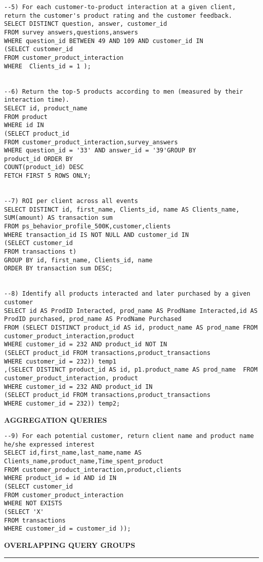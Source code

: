\begin{lstlisting}
--5) For each customer-to-product interaction at a given client, return the customer's product rating and the customer feedback.
SELECT DISTINCT question, answer, customer_id
FROM survey answers,questions,answers
WHERE question_id BETWEEN 49 AND 109 AND customer_id IN
(SELECT customer_id
FROM customer_product_interaction
WHERE  Clients_id = 1 );


--6) Return the top-5 products according to men (measured by their interaction time).
SELECT id, product_name
FROM product
WHERE id IN
(SELECT product_id
FROM customer_product_interaction,survey_answers
WHERE question_id = '33' AND answer_id = '39'GROUP BY
product_id ORDER BY
COUNT(product_id) DESC
FETCH FIRST 5 ROWS ONLY;


--7) ROI per client across all events
SELECT DISTINCT id, first_name, Clients_id, name AS Clients_name, SUM(amount) AS transaction sum
FROM ps_behavior_profile_500K,customer,clients
WHERE transaction_id IS NOT NULL AND customer_id IN
(SELECT customer_id
FROM transactions t)
GROUP BY id, first_name, Clients_id, name
ORDER BY transaction sum DESC;


--8) Identify all products interacted and later purchased by a given customer
SELECT id AS ProdID Interacted, prod_name AS ProdName Interacted,id AS ProdID purchased, prod_name AS ProdName Purchased
FROM (SELECT DISTINCT product_id AS id, product_name AS prod_name FROM customer_product_interaction,product
WHERE customer_id = 232 AND product_id NOT IN
(SELECT product_id FROM transactions,product_transactions
WHERE customer_id = 232)) temp1
,(SELECT DISTINCT product_id AS id, p1.product_name AS prod_name  FROM customer_product_interaction, product
WHERE customer_id = 232 AND product_id IN
(SELECT product_id FROM transactions,product_transactions
WHERE customer_id = 232)) temp2;
\end{lstlisting}
{\Large\textbf{AGGREGATION QUERIES}}
\begin{lstlisting}
--9) For each potential customer, return client name and product name he/she expressed interest
SELECT id,first_name,last_name,name AS Clients_name,product_name,Time_spent_product
FROM customer_product_interaction,product,clients
WHERE product_id = id AND id IN
(SELECT customer_id
FROM customer_product_interaction
WHERE NOT EXISTS
(SELECT 'X'
FROM transactions
WHERE customer_id = customer_id ));
\end{lstlisting}
{\Large\textbf{OVERLAPPING QUERY GROUPS}}\\
\noindent\rule{12.2cm}{0.4pt}\\
